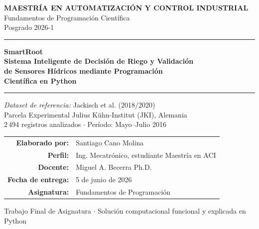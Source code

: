 \documentclass[12pt,a4paper]{article}
\begin{document}
\begin{titlepage}
\centering
\vspace*{1.5cm}

{\large \textbf{MAESTRÍA EN AUTOMATIZACIÓN Y CONTROL INDUSTRIAL}}\\[0.3cm]
{\normalsize Fundamentos de Programación Científica}\\[0.1cm]
{\normalsize Posgrado 2026-1}

\vspace{1.5cm}
\rule{\linewidth}{1.5pt}
\vspace{0.4cm}

{\LARGE \textbf{\textcolor{azulDark}{SmartRoot}}}\\[0.4cm]
{\large \textbf{Sistema Inteligente de Decisión de Riego y Validación}}\\[0.2cm]
{\large \textbf{de Sensores Hídricos mediante Programación}}\\[0.2cm]
{\large \textbf{Científica en Python}}

\vspace{0.4cm}
\rule{\linewidth}{1.5pt}
\vspace{1.2cm}

{\normalsize \textit{Dataset de referencia:} Jackisch et al. (2018/2020)}\\[0.1cm]
{\normalsize Parcela Experimental Julius Kühn-Institut (JKI), Alemania}\\[0.1cm]
{\normalsize 2\,494 registros analizados $\cdot$ Período: Mayo--Julio 2016}

\vspace{1.8cm}

\begin{tabular}{rl}
\textbf{Elaborado por:} & Santiago Cano Molina \\[4pt]
\textbf{Perfil:} & Ing. Mecatrónico, estudiante Maestría en ACI \\[4pt]
\textbf{Docente:} & Miguel A. Becerra Ph.D. \\[4pt]
\textbf{Fecha de entrega:} & 5 de junio de 2026 \\[4pt]
\textbf{Asignatura:} & Fundamentos de Programación \\
\end{tabular}

\vfill
{\small \textcolor{codegray}{Trabajo Final de Asignatura $\cdot$ Solución computacional funcional y explicada en Python}}
\end{titlepage}
\end{document}
